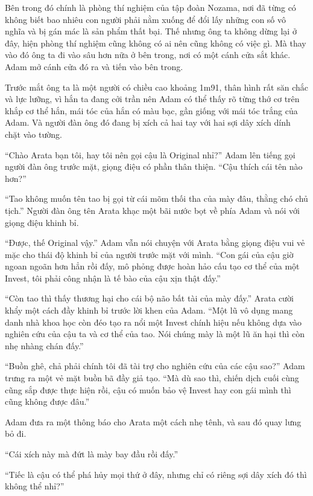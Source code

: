 {Bên trong đó chính là phòng thí nghiệm của tập đoàn Nozama, nơi đã từng
có không biết bao nhiêu con người phải nằm xuống để đổi lấy những con số
vô nghĩa và bị gán mác là sản phẩm thất bại. Thế nhưng ông ta không dừng
lại ở đây, hiện phòng thí nghiệm cũng không có ai nên cũng không có việc
gì. Mà thay vào đó ông ta đi vào sâu hơn nữa ở bên trong, nơi có một
cánh cửa sắt khác. Adam mở cánh cửa đó ra và tiến vào bên trong.

Trước mắt ông ta là một người có chiều cao khoảng 1m91, thân hình rất
săn chắc và lực lưỡng, vì hắn ta đang cởi trần nên Adam có thể thấy rõ
từng thớ cơ trên khắp cơ thể hắn, mái tóc của hắn có màu bạc, gần giống
với mái tóc trắng của Adam. Và người đàn ông đó đang bị xích cả hai tay
với hai sợi dây xích dính chặt vào tường.

``Chào Arata bạn tôi, hay tôi nên gọi cậu là Original nhỉ?'' Adam lên
tiếng gọi người đàn ông trước mặt, giọng điệu có phần thân thiện. ``Cậu
thích cái tên nào hơn?''

``Tao không muốn tên tao bị gọi từ cái mõm thối tha của mày đâu, thằng
chó chủ tịch.'' Người đàn ông tên Arata khạc một bãi nước bọt về phía
Adam và nói với giọng điệu khinh bỉ.

``Được, thế Original vậy.'' Adam vẫn nói chuyện với Arata bằng giọng
điệu vui vẻ mặc cho thái độ khinh bỉ của người trước mặt với mình. ``Con
gái của cậu giờ ngoan ngoãn hơn hẳn rồi đấy, mô phỏng được hoàn hảo cấu
tạo cơ thể của một Invest, tôi phải công nhận là tế bào của cậu xịn thật
đấy.''

``Còn tao thì thấy thương hại cho cái bộ não bất tài của mày đấy.''
Arata cười khẩy một cách đầy khinh bỉ trước lời khen của Adam. ``Một lũ
vô dụng mang danh nhà khoa học còn đéo tạo ra nổi một Invest chính hiệu
nếu không dựa vào nghiên cứu của cậu ta và cơ thể của tao. Nói chúng mày
là một lũ ăn hại thì còn nhẹ nhàng chán đấy.''

``Buồn ghê, chả phải chính tôi đã tài trợ cho nghiên cứu của các cậu
sao?'' Adam trưng ra một vẻ mặt buồn bã đầy giả tạo. ``Mà dù sao thì,
chiến dịch cuối cùng cũng sắp được thực hiện rồi, cậu có muốn bảo vệ
Invest hay con gái mình thì cũng không được đâu.''

Adam đưa ra một thông báo cho Arata một cách nhẹ tênh, và sau đó quay
lưng bỏ đi.

``Cái xích này mà đứt là mày bay đầu rồi đấy.''

``Tiếc là cậu có thể phá hủy mọi thứ ở đây, nhưng chỉ có riêng sợi dây
xích đó thì không thể nhỉ?''

}
